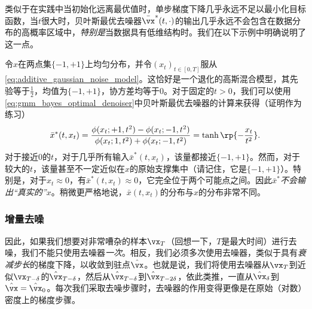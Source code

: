 \documentclass[../../book-main_zh.tex]{subfiles}
\begin{document}
类似于在实践中当初始化远离最优值时，单步梯度下降几乎永远不足以最小化目标函数，当\(t\)很大时，贝叶斯最优去噪器\(\bar{\vx}^{\ast}(t, \cdot)\)的输出几乎永远不会包含在数据分布的高概率区域中，\textit{特别是}当数据具有低维结构时。我们在以下示例中明确说明了这一点。
\begin{example}[两点混合的去噪]\label{example:denoising_twopoints}
    令\(x\)在两点集\(\{-1, +1\}\)上均匀分布，并令\((x_{t})_{t \in [0, T]}\)服从\eqref{eq:additive_gaussian_noise_model}。这恰好是一个退化的高斯混合模型，其先验等于\(\frac{1}{2}\)，均值为\(\{-1, +1\}\)，协方差均等于\(0\)。对于固定的\(t > 0\)，我们可以使用\eqref{eq:gmm_bayes_optimal_denoiser}中贝叶斯最优去噪器的计算来获得（证明作为练习）
    \begin{equation}
        \bar{x}^{\ast}(t, x_{t}) = \frac{\phi(x_{t} ; +1, t^{2}) - \phi(x_{t}
        ; -1, t^{2})}{\phi(x_{t} ; 1, t^{2}) + \phi(x_{t} ; -1,
        t^{2})} = \tanh\rp{-\frac{x_{t}}{t^{2}}}.
    \end{equation}
    对于接近\(0\)的\(t\)，对于几乎所有输入\(\bar{x}^{\ast}(t, x_{t})\)，该量都接近\(\{-1, +1\}\)。然而，对于较大的\(t\)，该量甚至不一定近似在\(x\)的原始支撑集中（请记住，它是\(\{-1,
    +1\}\)）。特别是，对于\(x_{t} \approx 0\)，有\(\bar{x}^{\ast}(t, x_{t}) \approx 0\)，它完全位于两个可能点之间。因此\(\bar{x}^{\ast}\)\textit{不会输出“真实的”\(x\)}。稍微更严格地说，\(\bar{x}(t, x_{t})\)的分布与\(x\)的分布非常不同。
\end{example}

\subsubsection{增量去噪}
因此，如果我们想要对非常嘈杂的样本\(\vx_{T}\)（回想一下，\(T\)是最大时间）进行去噪，我们不能只使用去噪器\textit{一次}。相反，我们必须多次使用去噪器，类似于具有\textit{衰减步长}的梯度下降，以收敛到驻点\(\hat{\vx}\)。也就是说，我们将使用去噪器从\(\vx_{T}\)到近似\(\vx_{T - \delta}\)的\(\hat{\vx}_{T - \delta}\)，然后从\(\hat{\vx}_{T -
\delta}\)到\(\hat{\vx}_{T - 2\delta}\)，依此类推，一直从\(\hat{\vx}_{\delta}\)到\(\hat{\vx} = \hat{\vx}_{0}\)。每次我们采取去噪步骤时，去噪器的作用变得更像是在原始（对数）密度上的梯度步骤。
\end{document}
